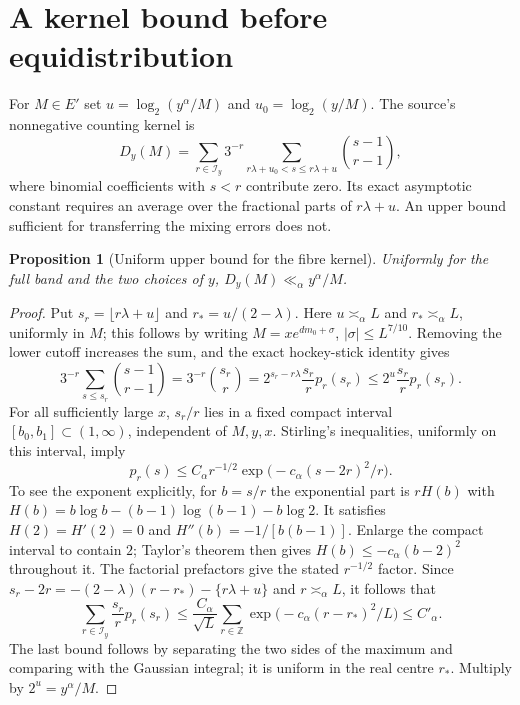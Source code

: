 \documentclass[11pt]{article}
\newtheorem{proposition}{Proposition}
\theoremstyle{remark}\newtheorem{remark}[proposition]{Remark}
\newcommand{\ZZ}{\mathbb Z}
\begin{document}
\section{A kernel bound before equidistribution}

For $M\in E'$ set $u=\log_2(y^\alpha/M)$ and
$u_0=\log_2(y/M)$. The source's nonnegative counting kernel is
\begin{equation}\label{eq:kernel-definition}
 D_y(M)=\sum_{r\in\mathcal I_y}3^{-r}
       \sum_{r\lambda+u_0<s\le r\lambda+u}\binom{s-1}{r-1},
\end{equation}
where binomial coefficients with $s<r$ contribute zero.
Its exact asymptotic constant requires an average over the fractional
parts of $r\lambda+u$. An upper bound sufficient for transferring the
mixing errors does not.

\begin{proposition}[Uniform upper bound for the fibre kernel]
\label{prop:kernel-upper}
Uniformly for the full band and the two choices of $y$,
$D_y(M)\ll_\alpha y^\alpha/M$.
\end{proposition}
\begin{proof}
Put $s_r=\lfloor r\lambda+u\rfloor$ and
$r_*=u/(2-\lambda)$. Here $u\asymp_\alpha L$ and
$r_*\asymp_\alpha L$, uniformly in $M$; this follows by writing
$M=xe^{dm_0+\sigma}$, $|\sigma|\le L^{7/10}$.
Removing the lower cutoff increases the sum, and the exact hockey-stick
identity gives
\[
 3^{-r}\sum_{s\le s_r}\binom{s-1}{r-1}
 =3^{-r}\binom{s_r}{r}
 =2^{s_r-r\lambda}\frac{s_r}{r}p_r(s_r)
 \le2^u\frac{s_r}{r}p_r(s_r).
\]
For all sufficiently large $x$, $s_r/r$ lies in a fixed compact
interval $[b_0,b_1]\subset(1,\infty)$, independent of $M,y,x$.
Stirling's inequalities, uniformly on this interval, imply
\[
 p_r(s)\le C_\alpha r^{-1/2}
               \exp\big(-c_\alpha(s-2r)^2/r\big).
\]
To see the exponent explicitly, for $b=s/r$ the exponential part is
$rH(b)$ with
$H(b)=b\log b-(b-1)\log(b-1)-b\log2$.
It satisfies $H(2)=H'(2)=0$ and
$H''(b)=-1/[b(b-1)]$. Enlarge the compact interval to contain $2$;
Taylor's theorem then gives $H(b)\le-c_\alpha(b-2)^2$ throughout it.
The factorial prefactors give the stated $r^{-1/2}$ factor.
Since
$s_r-2r=-(2-\lambda)(r-r_*)-\{r\lambda+u\}$ and
$r\asymp_\alpha L$, it follows that
\[
 \sum_{r\in\mathcal I_y}\frac{s_r}{r}p_r(s_r)
 \le\frac{C_\alpha}{\sqrt L}
       \sum_{r\in\ZZ}\exp\big(-c_\alpha(r-r_*)^2/L\big)
 \le C'_\alpha.
\]
The last bound follows by separating the two sides of the maximum and
comparing with the Gaussian integral; it is uniform in the real centre
$r_*$. Multiply by $2^u=y^\alpha/M$.
\end{proof}
\end{document}

